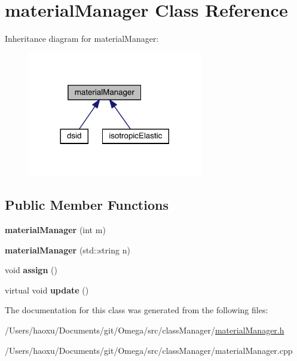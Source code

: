 \hypertarget{classmaterial_manager}{}\section{material\+Manager Class Reference}
\label{classmaterial_manager}


Inheritance diagram for material\+Manager\+:
\nopagebreak
\begin{figure}[H]
\begin{center}
\leavevmode
\includegraphics[width=216pt]{classmaterial_manager__inherit__graph}
\end{center}
\end{figure}
\subsection*{Public Member Functions}
\begin{DoxyCompactItemize}
\item 
\mbox{\label{classmaterial_manager_a7115733155d4980fb064ad2aba49f3b6}} 
{\bfseries material\+Manager} (int m)
\item 
\mbox{\label{classmaterial_manager_ac16268d521521df8030d7ab083f154b0}} 
{\bfseries material\+Manager} (std\+::string n)
\item 
\mbox{\label{classmaterial_manager_a7caaa224d43ed192b5a7cbcbad75d2ae}} 
void {\bfseries assign} ()
\item 
\mbox{\label{classmaterial_manager_a457cc335abb8e90f97a6a046b95d1162}} 
virtual void {\bfseries update} ()
\end{DoxyCompactItemize}


The documentation for this class was generated from the following files\+:\begin{DoxyCompactItemize}
\item 
/\+Users/haoxu/\+Documents/git/\+Omega/src/class\+Manager/\hyperlink{material_manager_8h}{material\+Manager.\+h}\item 
/\+Users/haoxu/\+Documents/git/\+Omega/src/class\+Manager/material\+Manager.\+cpp\end{DoxyCompactItemize}
